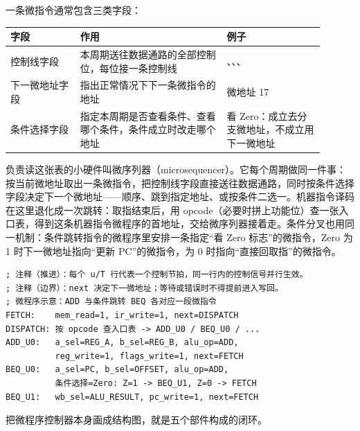 一条微指令通常包含三类字段：

\begin{longtable}{L{0.2\linewidth}L{0.42\linewidth}L{0.28\linewidth}}
\toprule
字段 & 作用 & 例子 \\
\midrule
控制线字段 & 本周期送往数据通路的全部控制位，每位接一条控制线 & 、、、 \\\tablerowrule
下一微地址字段 & 指出正常情况下下一条微指令的地址 &  微地址 17 \\\tablerowrule
条件选择字段 & 指定本周期是否查看条件、查看哪个条件，条件成立时改走哪个地址 & 看 Zero：成立去分支微地址，不成立用下一微地址 \\
\bottomrule
\end{longtable}

负责读这张表的小硬件叫微序列器（microsequencer）。它每个周期做同一件事：按当前微地址取出一条微指令，把控制线字段直接送往数据通路，同时按条件选择字段决定下一个微地址——顺序、跳到指定地址、或按条件二选一。机器指令译码在这里退化成一次跳转：取指结束后，用 opcode（必要时拼上功能位）查一张入口表，得到这条机器指令微程序的首地址，交给微序列器接着走。条件分叉也用同一机制：条件跳转指令的微程序里安排一条指定“看 Zero 标志”的微指令，Zero 为 1 时下一微地址指向“更新 PC”的微指令，为 0 时指向“直接回取指”的微指令。

\begin{lstlisting}
; 注释（推进）：每个 u/T 行代表一个控制节拍，同一行内的控制信号并行生效。
; 注释（边界）：next 决定下一微地址；等待或错误时不得提前进入写回。
; 微程序示意：ADD 与条件跳转 BEQ 各对应一段微指令
FETCH:    mem_read=1, ir_write=1, next=DISPATCH
DISPATCH: 按 opcode 查入口表 -> ADD_U0 / BEQ_U0 / ...
ADD_U0:   a_sel=REG_A, b_sel=REG_B, alu_op=ADD,
          reg_write=1, flags_write=1, next=FETCH
BEQ_U0:   a_sel=PC, b_sel=OFFSET, alu_op=ADD,
          条件选择=Zero: Z=1 -> BEQ_U1, Z=0 -> FETCH
BEQ_U1:   wb_sel=ALU_RESULT, pc_write=1, next=FETCH
\end{lstlisting}

把微程序控制器本身画成结构图，就是五个部件构成的闭环。

